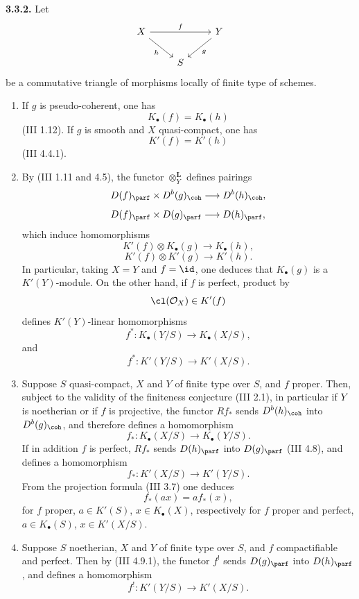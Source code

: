 \textbf{3.3.2.} Let
\[
\begin{tikzcd}
X\arrow[rr,"f"]\arrow[dr,"h"'] &&Y\arrow[dl,"g"]\\
&S&
\end{tikzcd}
\]
be a commutative triangle of morphisms locally of finite type of schemes.
\begin{enumerate}[label=\textbf{3.3.2.\arabic*.}, leftmargin=4em]
\item If \(g\) is pseudo-coherent, one has
\[
 K_{\bullet}(f)=K_{\bullet}(h)
\]
(III 1.12). If \(g\) is smooth and \(X\) quasi-compact, one has
\[
 K'(f)=K'(h)
\]
(III 4.4.1).

\item By (III 1.11 and 4.5), the functor \(\otimes_Y^{\mathbf L}\) defines pairings
\[
 D(f)_{\parf}\times D^b(g)_{\coh}\longrightarrow D^b(h)_{\coh},
\]
\[
 D(f)_{\parf}\times D(g)_{\parf}\longrightarrow D(h)_{\parf},
\]
which induce homomorphisms
\[
 K'(f)\otimes K_{\bullet}(g)\longrightarrow K_{\bullet}(h),
\]
\[
 K'(f)\otimes K'(g)\longrightarrow K'(h).
\]
In particular, taking \(X=Y\) and \(f=\id\), one deduces that \(K_{\bullet}(g)\) is a \(K'(Y)\)-module. On the other hand, if \(f\) is perfect, product by
\[
 \cl(\mathcal O_X)\in K'(f)
\]
defines \(K'(Y)\)-linear homomorphisms
\[
 f^*:K_{\bullet}(Y/S)\longrightarrow K_{\bullet}(X/S),
\]
and
\[
 f^*:K'(Y/S)\longrightarrow K'(X/S).
\]

\item Suppose \(S\) quasi-compact, \(X\) and \(Y\) of finite type over \(S\), and \(f\) proper. Then, subject to the validity of the finiteness conjecture (III 2.1), in particular if \(Y\) is noetherian or if \(f\) is projective, the functor \(Rf_*\) sends \(D^b(h)_{\coh}\) into \(D^b(g)_{\coh}\), and therefore defines a homomorphism
\[
 f_*:K_{\bullet}(X/S)\longrightarrow K_{\bullet}(Y/S).
\]
If in addition \(f\) is perfect, \(Rf_*\) sends \(D(h)_{\parf}\) into \(D(g)_{\parf}\) (III 4.8), and defines a homomorphism
\[
 f_*:K'(X/S)\longrightarrow K'(Y/S).
\]
From the projection formula (III 3.7) one deduces
\[
 f_*(a x)=a f_*(x),
\]
for \(f\) proper, \(a\in K'(S)\), \(x\in K_{\bullet}(X)\), respectively for \(f\) proper and perfect, \(a\in K_{\bullet}(S)\), \(x\in K'(X/S)\).

\item Suppose \(S\) noetherian, \(X\) and \(Y\) of finite type over \(S\), and \(f\) compactifiable and perfect. Then by (III 4.9.1), the functor \(f^!\) sends \(D(g)_{\parf}\) into \(D(h)_{\parf}\), and defines a homomorphism
\[
 f^!:K'(Y/S)\longrightarrow K'(X/S).
\]
\end{enumerate}

